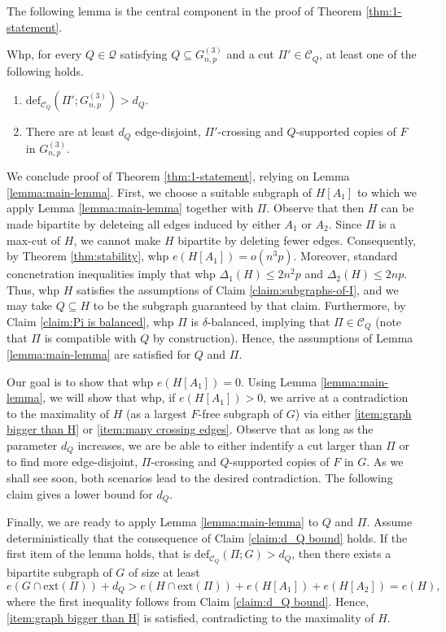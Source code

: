 \documentclass[11pt,a4paper,oneside,reqno]{amsart}
\newcommand{\Gnp}{G_{n, p}^{(3)}}
\newcommand{\cC}{\mathcal{C}}
\newcommand{\cQ}{\mathcal{Q}}
\newcommand{\1}{\mathbbm{1}} %
\renewcommand{\le}{\leqslant}
\newcommand{\deficit}{\mathrm{def}}
\newcommand{\ext}{\mathrm{ext}}
\begin{document}
The following lemma is the central component in the proof of Theorem \ref{thm:1-statement}. 
\begin{lemma}\label{lemma:main-lemma}
    Whp, for every $Q \in \cQ$ satisfying $Q \subseteq \Gnp$ and a cut $\Pi' \in \cC_Q$, at least one of the following holds.
    \begin{enumerate}
        \item $\deficit_{\cC_Q}\left(\Pi'; \Gnp\right) > d_Q$.
        \item There are at least $d_Q$ edge-disjoint, $\Pi'$-crossing and $Q$-supported copies of $F$ in $\Gnp$.
    \end{enumerate}    
\end{lemma}
We conclude proof of Theorem \ref{thm:1-statement}, relying on Lemma \ref{lemma:main-lemma}. First, we choose a suitable subgraph of $H[A_1]$ to which we apply Lemma \ref{lemma:main-lemma} together with $\Pi$. Observe that then $H$ can be made bipartite by deleteing all edges induced by either $A_1$ or $A_2$. Since $\Pi$ is a max-cut of $H$, we cannot make $H$ bipartite by deleting fewer edges. Consequently, by Theorem \ref{thm:stability}, whp $e(H[A_1]) = o(n^3 p)$. Moreover, standard concnetration inequalities imply that whp $\Delta_1(H) \le 2 n^2 p$ and $\Delta_2(H) \le 2np$. Thus, whp $H$ satisfies the assumptions of Claim \ref{claim:subgraphs-of-I}, and we may take $Q \subseteq H$ to be the subgraph guaranteed by that claim. Furthermore, by Claim \ref{claim:Pi is balanced}, whp $\Pi$ is $\delta$-balanced, implying that $\Pi \in \cC_Q$ (note that $\Pi$ is compatible with $Q$ by construction). Hence, the assumptions of Lemma \ref{lemma:main-lemma} are satisfied for $Q$ and $\Pi$.

Our goal is to show that whp $e(H[A_1]) = 0$. Using Lemma \ref{lemma:main-lemma}, we will show that whp, if $e(H[A_1]) > 0$, we arrive at a contradiction to the maximality of $H$ (as a largest $F$-free subgraph of $G$) via either \ref{item:graph bigger than H} or \ref{item:many crossing edges}. Observe that as long as the parameter $d_Q$ increases, we are be able to either indentify a cut larger than $\Pi$ or to find more edge-disjoint, $\Pi$-crossing and $Q$-supported copies of $F$ in $G$. As we shall see soon, both scenarios lead to the desired contradiction. The following claim gives a lower bound for $d_Q$.

Finally, we are ready to apply Lemma \ref{lemma:main-lemma} to $Q$ and $\Pi$. Assume deterministically that the consequence of Claim \ref{claim:d_Q bound} holds. If the first item of the lemma holds, that is $\deficit_{\cC_Q}(\Pi; G) > d_Q$, then there exists a bipartite subgraph of $G$ of size at least
\[
    e(G \cap \ext(\Pi)) + d_Q > e(H \cap \ext(\Pi)) + e(H[A_1]) + e(H[A_2]) = e(H),
\]
where the first inequality follows from Claim \ref{claim:d_Q bound}. Hence, \ref{item:graph bigger than H} is satisfied, contradicting to the maximality of $H$.
\end{document}
